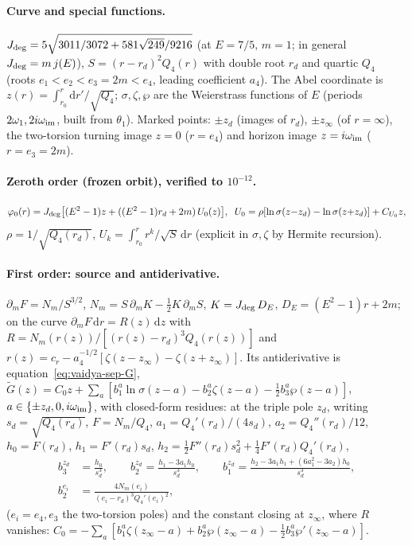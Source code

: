 \documentclass[12pt]{iopart}
\newcommand{\Jc}{J_{\rm deg}}
\newcommand{\dd}{\mathrm{d}}
\begin{document}
\paragraph{Curve and special functions.}
$\Jc=5\sqrt{3011/3072+581\sqrt{249}/9216}$ (at $E=7/5,\,m=1$; in general $\Jc=m\,j(E)$),
$S=(r-r_d)^2Q_4(r)$ with double root $r_d$ and quartic $Q_4$ (roots
$e_1<e_2<e_3=2m<e_4$, leading coefficient $a_4$). The Abel coordinate is
$z(r)=\int_{r_0}^r\dd r'/\sqrt{Q_4}$; $\sigma,\zeta,\wp$ are the Weierstrass functions
of $E$ (periods $2\omega_1,2i\omega_{\rm im}$, built from $\theta_1$). Marked points:
$\pm z_d$ (images of $r_d$), $\pm z_\infty$ (of $r=\infty$), the two-torsion turning
image $z=0$ ($r=e_4$) and horizon image $z=i\omega_{\rm im}$ ($r=e_3=2m$).

\paragraph{Zeroth order (frozen orbit), verified to $10^{-12}$.}
\begin{equation}
\varphi_0(r)=\Jc\big[(E^2-1)z+((E^2-1)r_d+2m)\,U_0(z)\big],\;\;
U_0=\rho[\ln\sigma(z{-}z_d)-\ln\sigma(z{+}z_d)]+C_{U_0}z,
\end{equation}
$\rho=1/\sqrt{Q_4(r_d)}$, $U_k=\int_{r_0}^r r^k/\sqrt S\,\dd r$ (explicit in
$\sigma,\zeta$ by Hermite recursion).

\paragraph{First order: source and antiderivative.}
$\partial_m F=N_m/S^{3/2}$, $N_m=S\,\partial_mK-\tfrac12K\,\partial_mS$, $K=\Jc\,D_E$,
$D_E=(E^2-1)r+2m$; on the curve $\partial_m F\,\dd r=R(z)\,\dd z$ with
$R=N_m(r(z))/[(r(z)-r_d)^3Q_4(r(z))]$ and $r(z)=c_r-a_4^{-1/2}[\zeta(z-z_\infty)-
\zeta(z+z_\infty)]$. Its antiderivative is equation~\eqref{eq:vaidya-sep-G},
$\tilde G(z)=C_0 z+\sum_{a}[b_1^a\ln\sigma(z-a)-b_2^a\zeta(z-a)-\tfrac12 b_3^a
\wp(z-a)]$, $a\in\{\pm z_d,0,i\omega_{\rm im}\}$, with closed-form residues: at the
triple pole $z_d$, writing $s_d=\sqrt{Q_4(r_d)}$, $F=N_m/Q_4$, $a_1=Q_4'(r_d)/(4s_d)$,
$a_2=Q_4''(r_d)/12$, $h_0=F(r_d)$, $h_1=F'(r_d)s_d$,
$h_2=\tfrac12F''(r_d)s_d^2+\tfrac14F'(r_d)Q_4'(r_d)$,
\begin{equation}
\begin{aligned}
b_3^{z_d}&=\frac{h_0}{s_d^3},\qquad
b_2^{z_d}=\frac{h_1-3a_1h_0}{s_d^3},\qquad
b_1^{z_d}=\frac{h_2-3a_1h_1+(6a_1^2-3a_2)h_0}{s_d^3},\\
b_2^{e_i}&=\frac{4N_m(e_i)}{(e_i-r_d)^3Q_4'(e_i)^2},
\end{aligned}
\end{equation}
($e_i=e_4,e_3$ the two-torsion poles) and the constant closing at $z_\infty$, where
$R$ vanishes: $C_0=-\sum_a[b_1^a\zeta(z_\infty-a)+b_2^a\wp(z_\infty-a)-\tfrac12
b_3^a\wp'(z_\infty-a)]$.
\end{document}
